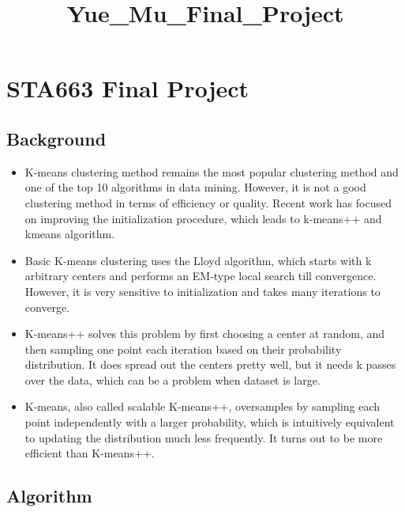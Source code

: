 \documentclass{article}
\title{Yue\_Mu\_Final\_Project}
\begin{document}
    
    
    \maketitle
    
    

    

    \section{STA663 Final Project}



    \subsection{Background}


    \begin{itemize}
\itemsep1pt\parskip0pt
\item
  K-means clustering method remains the most popular clustering method
  and one of the top 10 algorithms in data mining. However, it is not a
  good clustering method in terms of efficiency or quality. Recent work
  has focused on improving the initialization procedure, which leads to
  k-means++ and kmeans\textbar{}\textbar{} algorithm.
\item
  Basic K-means clustering uses the Lloyd algorithm, which starts with k
  arbitrary centers and performs an EM-type local search till
  convergence. However, it is very sensitive to initialization and takes
  many iterations to converge.
\item
  K-means++ solves this problem by first choosing a center at random,
  and then sampling one point each iteration based on their probability
  distribution. It does spread out the centers pretty well, but it needs
  k passes over the data, which can be a problem when dataset is large.
\item
  K-means\textbar{}\textbar{}, also called scalable K-means++,
  oversamples by sampling each point independently with a larger
  probability, which is intuitively equivalent to updating the
  distribution much less frequently. It turns out to be more efficient
  than K-means++.
\end{itemize}


    \subsection{Algorithm}
\end{document}
